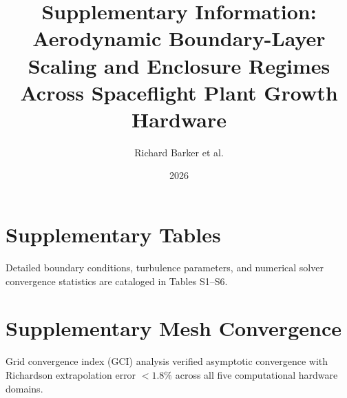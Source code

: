 \documentclass[11pt]{article}
\title{Supplementary Information: Aerodynamic Boundary-Layer Scaling and Enclosure Regimes Across Spaceflight Plant Growth Hardware}
\author{Richard Barker et al.}
\date{2026}
\begin{document}
\maketitle

\section{Supplementary Tables}
Detailed boundary conditions, turbulence parameters, and numerical solver convergence statistics are cataloged in Tables S1--S6.

\section{Supplementary Mesh Convergence}
Grid convergence index (GCI) analysis verified asymptotic convergence with Richardson extrapolation error $<1.8\%$ across all five computational hardware domains.
\end{document}
